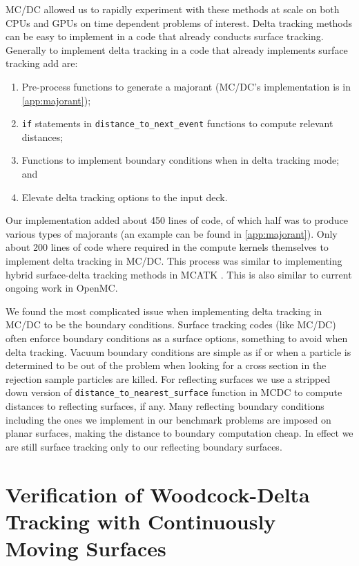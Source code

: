 MC/DC allowed us to rapidly experiment with these methods at scale on both CPUs and GPUs on time dependent problems of interest.
Delta tracking methods can be easy to implement in a code that already conducts surface tracking. 
Generally to implement delta tracking in a code that already implements surface tracking add are:
\begin{enumerate}
    \item Pre-process functions to generate a majorant (MC/DC's implementation is in \ref{app:majorant});
    \item \texttt{if} statements in \texttt{distance\_to\_next\_event} functions to compute relevant distances;
    \item Functions to implement boundary conditions when in delta tracking mode; and
    \item Elevate delta tracking options to the input deck.
\end{enumerate}
Our implementation added about \num{450} lines of code, of which half was to produce various types of majorants (an example can be found in \ref{app:majorant}). 
Only about \num{200} lines of code where required in the compute kernels themselves to implement delta tracking in MC/DC.
This process was similar to implementing hybrid surface-delta tracking methods in MCATK \cite{morgan2023delta}.
This is also similar to current ongoing work in OpenMC.

We found the most complicated issue when implementing delta tracking in MC/DC to be the boundary conditions.
Surface tracking codes (like MC/DC) often enforce boundary conditions as a surface options, something to avoid when delta tracking.
Vacuum boundary conditions are simple as if or when a particle is determined to be out of the problem when looking for a cross section in the rejection sample particles are killed.
For reflecting surfaces we use a stripped down version of \texttt{distance\_to\_nearest\_surface} function in MCDC to compute distances to reflecting surfaces, if any.
Many reflecting boundary conditions including the ones we implement in our benchmark problems are imposed on planar surfaces, making the distance to boundary computation cheap.
In effect we are still surface tracking only to our reflecting boundary surfaces.


\section{Verification of Woodcock-Delta Tracking with Continuously Moving Surfaces}

